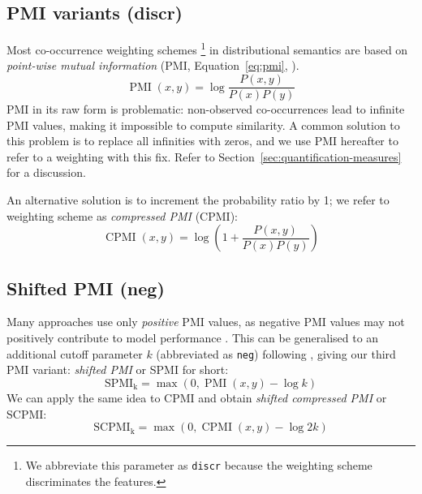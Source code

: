 \subsection{PMI variants (discr)}
\label{sec:pmi-variants}

Most co-occurrence weighting schemes%
\footnote{We abbreviate this parameter as \texttt{discr} because the weighting scheme discriminates the features.
}
in distributional semantics are based on \emph{point-wise mutual information} (PMI, Equation~\ref{eq:pmi}, ).
%
\begin{equation}
  \label{eq:pmi}
  \operatorname{PMI}(x, y) = \log\frac{P(x,y)}{P(x)P(y)}
\end{equation}
%
PMI in its raw form is problematic: non-observed co-occurrences lead to infinite PMI values, making it impossible to compute similarity. A common solution to this problem is to replace all infinities with zeros, and we use PMI hereafter to refer to a weighting with this fix. Refer to Section~\ref{sec:quantification-measures} for a discussion.

An alternative solution is to increment the probability ratio by 1; we refer to weighting scheme as \emph{compressed PMI} (CPMI):
%
\begin{equation}
  \label{eq:cpmi}
  \operatorname{CPMI}(x, y) = \log\left( 1 +  \frac{P(x,y)}{P(x)P(y)} \right)
\end{equation}

\subsection{Shifted PMI (neg)}
\label{sec:shifted-pmi}

Many approaches use only \emph{positive} PMI values, as  negative PMI values may not positively contribute to model performance \cite{Turney:2010:FMV:1861751.1861756}. This can be generalised to an additional cutoff parameter $k$ (abbreviated as \texttt{neg}) following , giving our third PMI variant: \emph{shifted PMI} or SPMI for short:
%
\begin{equation}
  \label{eq:ppmi}
  \operatorname{SPMI_k} = \max (0, \operatorname{PMI}(x, y) - \log k)
\end{equation}
%
We can apply the same idea to CPMI and obtain \emph{shifted compressed PMI} or SCPMI:
%
\begin{equation}
  \label{eq:pcpmi}
  \operatorname{SCPMI_k} = \max (0, \operatorname{CPMI}(x, y) - \log 2k)
\end{equation}


